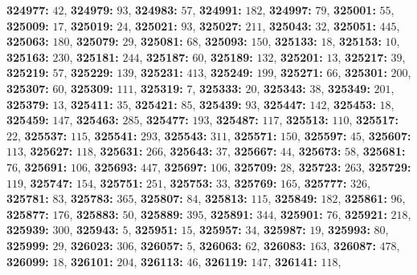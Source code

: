 \textsf{\bfseries 324977:} $42$, \textsf{\bfseries 324979:} $93$, \textsf{\bfseries 324983:} $57$, \textsf{\bfseries 324991:} $182$, \textsf{\bfseries 324997:} $79$, \textsf{\bfseries 325001:} $55$, \textsf{\bfseries 325009:} $17$, \textsf{\bfseries 325019:} $24$, \textsf{\bfseries 325021:} $93$, \textsf{\bfseries 325027:} $211$, \textsf{\bfseries 325043:} $32$, \textsf{\bfseries 325051:} $445$, \textsf{\bfseries 325063:} $180$, \textsf{\bfseries 325079:} $29$, \textsf{\bfseries 325081:} $68$, \textsf{\bfseries 325093:} $150$, \textsf{\bfseries 325133:} $18$, \textsf{\bfseries 325153:} $10$, \textsf{\bfseries 325163:} $230$, \textsf{\bfseries 325181:} $244$, \textsf{\bfseries 325187:} $60$, \textsf{\bfseries 325189:} $132$, \textsf{\bfseries 325201:} $13$, \textsf{\bfseries 325217:} $39$, \textsf{\bfseries 325219:} $57$, \textsf{\bfseries 325229:} $139$, \textsf{\bfseries 325231:} $413$, \textsf{\bfseries 325249:} $199$, \textsf{\bfseries 325271:} $66$, \textsf{\bfseries 325301:} $200$, \textsf{\bfseries 325307:} $60$, \textsf{\bfseries 325309:} $111$, \textsf{\bfseries 325319:} $7$, \textsf{\bfseries 325333:} $20$, \textsf{\bfseries 325343:} $38$, \textsf{\bfseries 325349:} $201$, \textsf{\bfseries 325379:} $13$, \textsf{\bfseries 325411:} $35$, \textsf{\bfseries 325421:} $85$, \textsf{\bfseries 325439:} $93$, \textsf{\bfseries 325447:} $142$, \textsf{\bfseries 325453:} $18$, \textsf{\bfseries 325459:} $147$, \textsf{\bfseries 325463:} $285$, \textsf{\bfseries 325477:} $193$, \textsf{\bfseries 325487:} $117$, \textsf{\bfseries 325513:} $110$, \textsf{\bfseries 325517:} $22$, \textsf{\bfseries 325537:} $115$, \textsf{\bfseries 325541:} $293$, \textsf{\bfseries 325543:} $311$, \textsf{\bfseries 325571:} $150$, \textsf{\bfseries 325597:} $45$, \textsf{\bfseries 325607:} $113$, \textsf{\bfseries 325627:} $118$, \textsf{\bfseries 325631:} $266$, \textsf{\bfseries 325643:} $37$, \textsf{\bfseries 325667:} $44$, \textsf{\bfseries 325673:} $58$, \textsf{\bfseries 325681:} $76$, \textsf{\bfseries 325691:} $106$, \textsf{\bfseries 325693:} $447$, \textsf{\bfseries 325697:} $106$, \textsf{\bfseries 325709:} $28$, \textsf{\bfseries 325723:} $263$, \textsf{\bfseries 325729:} $119$, \textsf{\bfseries 325747:} $154$, \textsf{\bfseries 325751:} $251$, \textsf{\bfseries 325753:} $33$, \textsf{\bfseries 325769:} $165$, \textsf{\bfseries 325777:} $326$, \textsf{\bfseries 325781:} $83$, \textsf{\bfseries 325783:} $365$, \textsf{\bfseries 325807:} $84$, \textsf{\bfseries 325813:} $115$, \textsf{\bfseries 325849:} $182$, \textsf{\bfseries 325861:} $96$, \textsf{\bfseries 325877:} $176$, \textsf{\bfseries 325883:} $50$, \textsf{\bfseries 325889:} $395$, \textsf{\bfseries 325891:} $344$, \textsf{\bfseries 325901:} $76$, \textsf{\bfseries 325921:} $218$, \textsf{\bfseries 325939:} $300$, \textsf{\bfseries 325943:} $5$, \textsf{\bfseries 325951:} $15$, \textsf{\bfseries 325957:} $34$, \textsf{\bfseries 325987:} $19$, \textsf{\bfseries 325993:} $80$, \textsf{\bfseries 325999:} $29$, \textsf{\bfseries 326023:} $306$, \textsf{\bfseries 326057:} $5$, \textsf{\bfseries 326063:} $62$, \textsf{\bfseries 326083:} $163$, \textsf{\bfseries 326087:} $478$, \textsf{\bfseries 326099:} $18$, \textsf{\bfseries 326101:} $204$, \textsf{\bfseries 326113:} $46$, \textsf{\bfseries 326119:} $147$, \textsf{\bfseries 326141:} $118$, 
